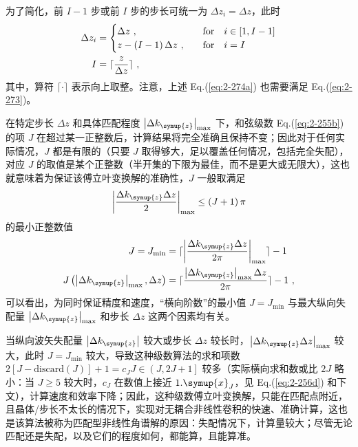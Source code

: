 为了简化，前 $I-1$ 步或前 $I$ 步的步长可统一为 $\Delta z_i = \Delta z$，此时
\begin{subequations} \label{eq:2-274}
	\abovedisplayskip=13pt
	\belowdisplayskip=13pt
	\begin{align}
		\Delta z_i &= \begin{cases}
			\Delta z ~, &\quad \text{for} \ \ \ i \in \left[ 1, I-1 \right]\\
			z - \left( I-1 \right) \Delta z ~, &\quad \text{for} \ \ \ i = I \\
		\end{cases} \label{eq:2-274a} \\ I &= \lceil \frac{z}{\Delta z} \rceil \label{eq:2-274b} ~,
	\end{align}
\end{subequations}
其中，算符 $\lceil \cdot \rceil$ 表示向上取整。注意，上述 Eq.(\ref{eq:2-274a}) 也需要满足 Eq.(\ref{eq:2-273})。

在特定步长 $\Delta z$ 和具体匹配程度 $\left|\Delta k_{\symup{z}}\right|_{\max}$ 下，和弦级数 Eq.(\ref{eq:2-255b}) 的项 $J$ 在超过某一正整数后，计算结果将完全准确且保持不变；因此对于任何实际情况，$J$ 都是有限的（只要 $J$ 取得够大，足以覆盖任何情况，包括完全失配），对应 $J$ 的取值是某个正整数（半开集的下限为最佳，而不是更大或无限大），这也就意味着为保证该傅立叶变换解的准确性，$J$ 一般取满足
\begin{equation} \label{eq:2-275}
	\left| \frac{ \Delta k_{\symup{z}} \Delta z }{ 2 }  \right|_{\max} \leq \left( J+1 \right) \pi
\end{equation}
的最小正整数值
\begin{subequations} \label{eq:2-276}
	\abovedisplayskip=13pt
	\belowdisplayskip=13pt
	\begin{align}
		J = J_{\min} &= \lceil \left| \frac{ \Delta k_{\symup{z}} \Delta z }{ 2 \pi }  \right|_{\max} \rceil - 1 \label{eq:2-276a} \\ J \left( \left| \Delta k_{\symup{z}} \right|_{\max}, \Delta z \right) &= \lceil \frac{ \left| \Delta k_{\symup{z}} \right|_{\max} \Delta z }{ 2 \pi } \rceil - 1 \label{eq:2-276b} ~,
	\end{align}
\end{subequations}
可以看出，为同时保证精度和速度，“横向阶数”的最小值 $J = J_{\min}$ 与最大纵向失配量 $\left|\Delta k_{\symup{z}}\right|_{\max}$ 和步长 $\Delta z$ 这两个因素均有关。

当纵向波矢失配量 $\left|\Delta k_{\symup{z}}\right|$ 较大或步长 $\Delta z$ 较长时，$\left|\Delta k_{\symup{z}} \Delta z\right|_{\max}$ 较大，此时 $J = J_{\min}$ 较大，导致这种级数算法的求和项数 $2 \left[ J - \text{discard} \left( J \right) \right] + 1 = c_J J \in \left( J, 2J + 1 \right]$ 较多（实际横向求和数或比 $2J$ 略小：当 $J \geq 5$ 较大时，$c_J$ 在数值上接近 $1.\symup{x}_J$，见 Eq.(\ref{eq:2-256d}) 和下文），计算速度和效率下降；因此，这种级数傅立叶变换解，只能在匹配点附近，且晶体/步长不太长的情况下，实现对无耦合非线性卷积的快速、准确计算，这也是该算法被称为匹配型非线性角谱解的原因：失配情况下，计算量较大；尽管无论匹配还是失配，以及它们的程度如何，都能算，且能算准。

